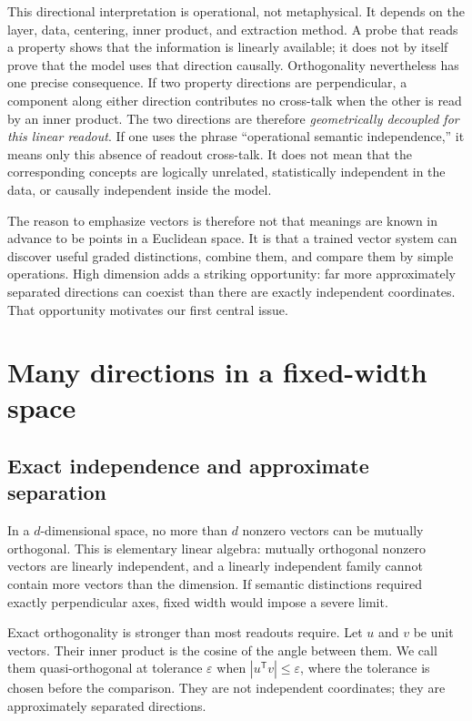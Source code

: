 \documentclass[
  aps,
  reprint,
  superscriptaddress,
  floatfix,
  nofootinbib,
  longbibliography
]{revtex4-2}
\newcommand{\T}{^{\mathsf T}}
\begin{document}
This directional interpretation is operational, not metaphysical.  It depends
on the layer, data, centering, inner product, and extraction method.  A probe
that reads a property shows that the information is linearly available; it
does not by itself prove that the model uses that direction causally.
Orthogonality nevertheless has one precise consequence.  If two property
directions are perpendicular, a component along either direction contributes
no cross-talk when the other is read by an inner product.  The two directions
are therefore \emph{geometrically decoupled for this linear readout}.  If one
uses the phrase ``operational semantic independence,'' it means only this
absence of readout cross-talk.  It does not mean that the corresponding concepts are
logically unrelated, statistically independent in the data, or causally
independent inside the model.

The reason to emphasize vectors is therefore not that meanings are known in
advance to be points in a Euclidean space.  It is that a trained vector system
can discover useful graded distinctions, combine them, and compare them by
simple operations.  High dimension adds a striking opportunity: far more
approximately separated directions can coexist than there are exactly
independent coordinates.  That opportunity motivates our first central
issue.

\section{Many directions in a fixed-width space}
\label{sec:quasi}

\subsection{Exact independence and approximate separation}

In a $d$-dimensional space, no more than $d$ nonzero vectors can be mutually
orthogonal.  This is elementary linear algebra: mutually orthogonal nonzero
vectors are linearly independent, and a linearly independent family cannot
contain more vectors than the dimension.  If semantic distinctions required
exactly perpendicular axes, fixed width would impose a severe limit.

Exact orthogonality is stronger than most readouts require.  Let $u$ and $v$
be unit vectors.  Their inner product is the cosine of the angle between them.
We call them quasi-orthogonal at tolerance $\varepsilon$ when
$|u\T v|\leq\varepsilon$, where the tolerance is chosen before the comparison.
They are not independent coordinates; they are approximately separated
directions.
\end{document}
